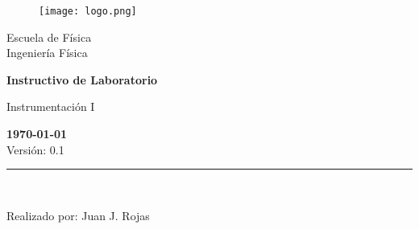\documentclass[12pt,letterpaper]{report}
\begin{document}
\begin{titlepage}
    \begin{center}
\vspace*{1in}
\begin{figure}[htb]
\begin{center}
\texttt{[image: logo.png]}
\end{center}
\end{figure}
\vspace*{0.4in}
\begin{Large}
Escuela de Física\\
\vspace*{0.15in}
Ingeniería Física\\
\vspace*{0.8in}
\end{Large}
\vspace*{0.2in}
\begin{Large}
\textbf{Instructivo de Laboratorio} \\
\end{Large}
\vspace*{0.3in}
\begin{large}
Instrumentación I\\
\end{large}
\vspace*{2.5in}
\begin{Large}
\textbf{\today}\\
Versión: 0.1\\
\end{Large}
\rule{80mm}{0.1mm}\\
\vspace*{0.1in}
\begin{large}
Realizado por: Juan J. Rojas\\
\end{large}
\end{center}
\end{titlepage}
\tableofcontents





\printbibliography
\end{document}
